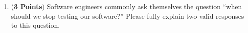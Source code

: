 \documentclass[12pt,epsf,psfig,graphics]{article}
\begin{document}
\begin{enumerate}
\begin{enumerate}
  \item ({\bf 3 Points}) Software engineers commonly ask themselves the question ``when should we stop testing our
    software?''  Please fully explain two valid responses to this question.


\end{enumerate}

\end{enumerate}
\end{document}
